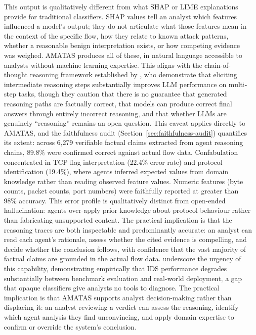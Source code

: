 \documentclass[../main.tex]{subfiles}
\begin{document}
This output is qualitatively different from what SHAP or LIME explanations provide for traditional classifiers. SHAP values tell an analyst which features influenced a model's output; they do not articulate what those features mean in the context of the specific flow, how they relate to known attack patterns, whether a reasonable benign interpretation exists, or how competing evidence was weighed. AMATAS produces all of these, in natural language accessible to analysts without machine learning expertise. This aligns with the chain-of-thought reasoning framework established by \textcite{Wei2022}, who demonstrate that eliciting intermediate reasoning steps substantially improves LLM performance on multi-step tasks, though they caution that there is no guarantee that generated reasoning paths are factually correct, that models can produce correct final answers through entirely incorrect reasoning, and that whether LLMs are genuinely ``reasoning'' remains an open question. This caveat applies directly to AMATAS, and the faithfulness audit (Section~\ref{sec:faithfulness-audit}) quantifies its extent: across 6{,}279 verifiable factual claims extracted from agent reasoning chains, 89.8\% were confirmed correct against actual flow data. Confabulation concentrated in TCP flag interpretation (22.4\% error rate) and protocol identification (19.4\%), where agents inferred expected values from domain knowledge rather than reading observed feature values. Numeric features (byte counts, packet counts, port numbers) were faithfully reported at greater than 98\% accuracy. This error profile is qualitatively distinct from open-ended hallucination: agents over-apply prior knowledge about protocol behaviour rather than fabricating unsupported content. The practical implication is that the reasoning traces are both inspectable and predominantly accurate: an analyst can read each agent's rationale, assess whether the cited evidence is compelling, and decide whether the conclusion follows, with confidence that the vast majority of factual claims are grounded in the actual flow data. \textcite{Hesford2024} underscore the urgency of this capability, demonstrating empirically that IDS performance degrades substantially between benchmark evaluation and real-world deployment, a gap that opaque classifiers give analysts no tools to diagnose. The practical implication is that AMATAS supports analyst decision-making rather than displacing it: an analyst reviewing a verdict can assess the reasoning, identify which agent analysis they find unconvincing, and apply domain expertise to confirm or override the system's conclusion.
\end{document}
